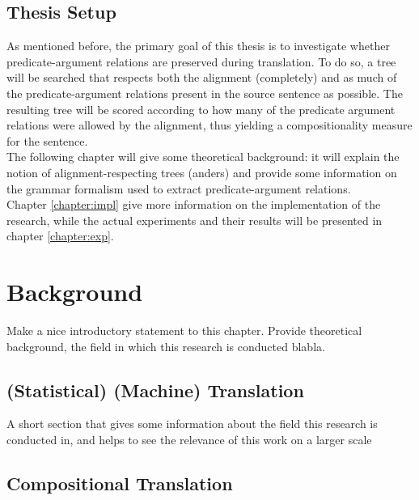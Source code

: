 \documentclass{report}
\theoremstyle{indented}
\begin{document}
\section*{Thesis Setup}

As mentioned before, the primary goal of this thesis is to investigate whether predicate-argument relations are preserved during translation. To do so, a tree will be searched that respects both the alignment (completely) and as much of the predicate-argument relations present in the source sentence as possible. The resulting tree will be scored according to how many of the predicate argument relations were allowed by the alignment, thus yielding a compositionality measure for the sentence.\\
The following chapter will give some theoretical background: it will explain the notion of alignment-respecting trees (anders) and provide some information on the grammar formalism used to extract predicate-argument relations.\\
Chapter \ref{chapter:impl} give more information on the implementation of the research, while the actual experiments and their results will be presented in chapter \ref{chapter:exp}.


\chapter{Background}

Make a nice introductory statement to this chapter. Provide theoretical background, the field in which this research is conducted blabla.


\section{(Statistical) (Machine) Translation}
A short section that gives some information about the field this research is conducted in, and helps to see the relevance of this work on a larger scale




\section{Compositional Translation}
\end{document}

